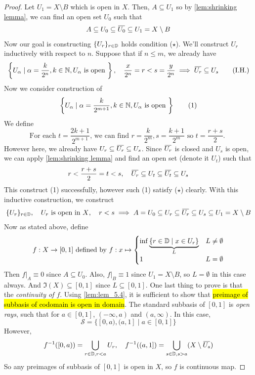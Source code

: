 \documentclass[12pt, a4paper, twoside]{article}
\newcommand{\overbar}[1]{\mkern 1.5mu\overline{\mkern-1.5mu#1\mkern-1.5mu}\mkern 1.5mu}
\newcommand{\CS}{{\mathcal {S}}} \newcommand{\CT}{{\mathcal {T}}}
\theoremstyle{plain}
\begin{document}
\begin{proof}
    Let $U_1 = X \setminus B$ which is open in $X$. 
    Then, $A \subseteq U_1$ so by \ref{lem:shrinking lemma}, we can find an open set $U_0$ such that 
    \[A \subseteq U_0 \subseteq \overbar{U_0} \subseteq U_1 = X \setminus B\]   
    Now our goal is constructing $\{U_r\}_{r \in {\mathbb {D}}}$ holds condition ($\star$). 
    We'll construct $U_r$ inductively with respect to $n$. 
    Suppose that if $n \leq m$, we already have 
    \[ \left\{U_\alpha \mid \alpha = \frac{k}{2^n} , k \in \BN , U_\alpha \text{ is open }\right\} , \quad \frac{x}{2^n} = r < s = \frac{y}{2^n} \implies \overbar{U_r} \subseteq U_s \tag{I.H.}\]
    Now we consider construction of 
    \[\left\{U_\alpha \mid \alpha = \frac{k}{2^{m+1}}, k \in {\mathbb {N}}, U_\alpha \text{ is open }\right\} \tag{1}\]
    We define 
    \[ \text{For each $t = \frac{2k+1}{2^{m+1}}$, we can find $r = \frac{k}{2^m}, s = \frac{k+1}{2^m}$ so $t = \frac{r + s}{2}$. } \]
    However here, we already have $U_r \subseteq \overbar{U_r} \subseteq U_s$. Since $\overbar{U_r}$ is closed and $U_s$ is open, 
    we can apply \ref{lem:shrinking lemma} and find an open set (denote it $U_t$) such that 
    \[r < \frac{r + s}{2} = t < s , \quad \overbar{U_r} \subseteq U_t \subseteq \overbar{U_t} \subseteq U_s\]
    This construct (1) successfully, however such (1) satisfy ($\star$) clearly. 
    With this inductive construction, we construct 
    \[\{U_r\}_{r \in \BD}, \quad U_r \text{ is open in $X$}, \quad r < s \implies A = U_0 \subseteq U_r \subseteq \overbar{U_r} \subseteq U_s \subseteq U_1 = X \setminus B\]
    Now as stated above, define 
    \[f: X \rightarrow [0, 1] \text{ defined by } f: x \mapsto \begin{cases}
        \inf \underbrace{\{r \in {\mathbb {D}} \mid x \in U_r\}}_{L} & L \neq \emptyset \\
        1 & L = \emptyset
    \end{cases}\]
    Then $f|_A \equiv 0$ since $A \subseteq U_0$. Also, $f|_B \equiv 1$ since 
    $U_1 = X \setminus B$, so $L = \emptyset$ in this case always. 
    And $\Im(X) \subseteq [0, 1]$ since $L \subseteq [0, 1]$. One last thing to prove is that the 
    \textit{continuity of $f$}. Using \ref{lem:lem_5.4}, it is sufficient to show that \hl{preimage of subbasis of codomain is open in domain}. 
    The standard subbasis of $[0,1]$ is \textit{open rays}, such that for $a \in [0,1]$, $(-\infty, a)$ and $(a, \infty)$. In this case, 
    \[\CS = \{[0, a), (a, 1] \mid a \in [0,1]\}\]
    However, 
    \[f^{-1}([0, a)) = \bigcup_{r \in \BD, r < a} U_r, \quad f^{-1}((a, 1]) = \bigcup_{s \in \BD, s > a} (X \setminus \overbar{U_s})\]
    So any preimages of subbasis of $[0,1]$ is open in $X$, so $f$ is continuous map. 
\end{proof}
\end{document}
